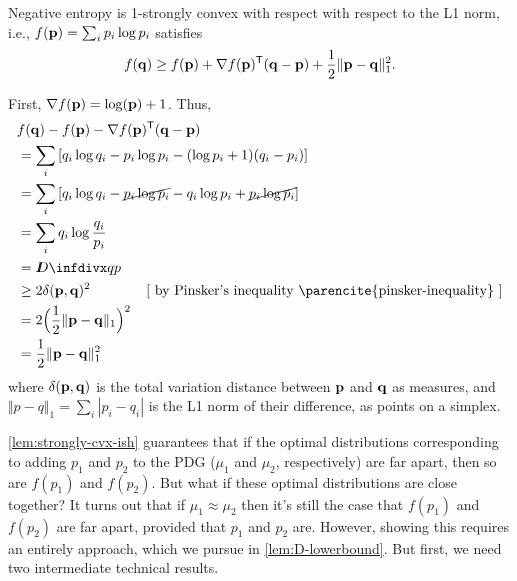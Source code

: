 \begin{lemma} \label{lem:negent-strongly-cvx-1norm}
    Negative entropy is 1-strongly convex with 
    respect with respect to the L1 norm, i.e.,
    $f(\mathbf p) = \sum_i p_i \log p_i$ satisfies
    \[
        f(\mathbf q) \ge f(\mathbf p) + \nabla f(\mathbf p)^{\sf T} (\mathbf q - \mathbf p)
            + \frac12 \Vert \mathbf p - \mathbf q \Vert_1^2.
    \]
\end{lemma}
\begin{lproof}
    First, $\nabla f(\mathbf p) = \log(\mathbf p) + 1$. 
    Thus, 
    \begin{align*}
        &f(\mat q) - f(\mat p) - \nabla f(\mat p)^{\sf T} (\mat q - \mat p)\\
        &= \sum_i \left[ q_i \log q_i - p_i \log p_i - (\log p_i + 1)(q_i-p_i) \right]\\
        &= \sum_i \left[ q_i \log q_i - \Cancel{p_i \log p_i} - q_i \log p_i + \Cancel{p_i \log p_i} \right]\\
        &= \sum_i q_i \log \frac{q_i}{p_i} \\
        &= \kldiv{q}{p} \\
        &\ge 2 \delta(\mat p, \mat q)^2
            \qquad\qquad[\text{ by Pinsker's inequality
                \parencite{pinsker-inequality}
            }] \\
        &= 2 \Big(\frac12 \Vert \mat p - \mat q \Vert_1 \Big)^2 \\
        &= \frac12 \Vert \mat p - \mat q \Vert_1^2
    \end{align*}
    where $\delta(\mathbf p, \mathbf q)$ is the total variation distance between $\mathbf p$ and $\mathbf q$ as measures, and $\Vert p - q \Vert_1 = \sum_i |p_i - q_i|$ is the L1 norm of their difference, as
    points on a simplex. 
\end{lproof}

\cref{lem:strongly-cvx-ish} guarantees
that if the optimal distributions corresponding to adding $p_1$ and $p_2$ to the PDG
($\mu_1$ and $\mu_2$, respectively) are far apart, then so are
$f(p_1)$ and $f(p_2)$.  But what if these optimal distributions are close together?
It turns out that if $\mu_1 \approx \mu_2$ then it's still the case that $f(p_1)$ and $f(p_2)$ are far apart, provided that $p_1$ and $p_2$ are.
However, showing this requires an entirely approach, which we pursue in \cref{lem:D-lowerbound}.
But first, we need two intermediate technical results.

